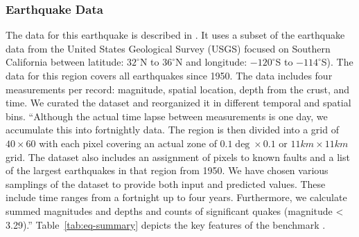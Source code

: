 \documentclass[utf8]{FrontiersinVancouver} %
\begin{document}
\subsubsection{Earthquake Data}

The data for this earthquake is described in \citep{las-22-mlcommons-science}.  It uses a subset of the earthquake data from the United States Geological Survey (USGS) focused on Southern California between latitude: $32^\circ$N to $36^\circ$N and longitude: $-120^\circ$S to $-114^\circ$S). The data for this region covers all earthquakes since 1950. The data includes four measurements per record: magnitude, spatial location, depth from the crust, and time. We curated the dataset and reorganized it in different temporal and spatial bins. ``Although the actual time lapse between measurements is one day, we accumulate this into fortnightly data. The region is then divided into a grid of $40\times 60$ with each pixel covering an actual zone of $0.1\deg\times 0.1$ or $11km\times 11km$ grid. The dataset also includes an assignment of pixels to known faults and a list of the largest earthquakes in that region from 1950. We have chosen various samplings of the dataset to provide both input and predicted values. These include time ranges from a fortnight up to four years. Furthermore, we calculate summed magnitudes and depths and counts of significant quakes (magnitude < 3.29).''  Table~\ref{tab:eq-summary} depicts the key features of the benchmark \citep{las-22-mlcommons-science}.
\end{document}
